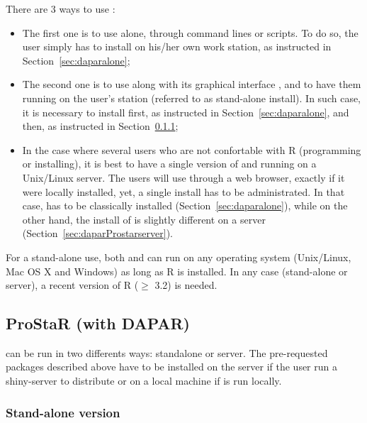 \documentclass[12pt]{article}
\begin{document}
There are 3 ways to use :
\begin{itemize}
\item The first one is to use  alone, through command lines or scripts. To do so, the user simply has to install  on his/her own work station, as instructed in Section~\ref{sec:daparalone};
\item The second one is to use  along with its graphical interface , and to have them running on the user's station (referred to as stand-alone install). In such case, it is necessary to install  first, as instructed in Section~\ref{sec:daparalone}, and  then, as instructed in Section~\ref{sec:daparProstarstandalone};
\item In the case where several  users who are not confortable with R (programming or installing), it is best to have a single version of  and  running on a Unix/Linux server. The users will use  through a web browser, exactly if it were locally installed, yet, a single install has to be administrated. In that case,  has to be classically installed (Section~\ref{sec:daparalone}), while on the other hand,  the install of  is slightly different on a server (Section~\ref{sec:daparProstarserver}).
\end{itemize}
For a stand-alone use, both  and  can run on any operating system (Unix/Linux, Mac OS X and Windows) as long as R is installed. 
In any case (stand-alone or server), a recent version of R ($\geq$ 3.2) is needed.


\subsection{ProStaR (with DAPAR)}\label{sec:daparProstar}

 can be run in two differents ways: standalone or server. The pre-requested packages described above have to be installed on the server if the user run a shiny-server to distribute  or on a local machine if  is run locally.



\subsubsection{Stand-alone version}\label{sec:daparProstarstandalone}
\end{document}
